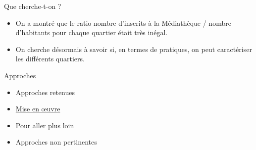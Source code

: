 \documentclass{beamer}
\begin{document}
\begin{frame}{Que cherche-t-on ?}
	\begin{itemize}
		\item On a montré que le ratio nombre d'inscrits à la Médiathèque / nombre d'habitants pour chaque quartier était très inégal.
		\item On cherche désormais à savoir si, en termes de pratiques, on peut caractériser les différents quartiers.
	\end{itemize}
\end{frame}

\begin{frame}{Approches}
	\begin{itemize}
		\item Approches retenues
		\item \href{https://github.com/ragbx/aqm/blob/master/02_analyse_donnees.ipynb}{Mise en œuvre}
		\item Pour aller plus loin
		\item Approches non pertinentes
	\end{itemize}
\end{frame}
\end{document}
